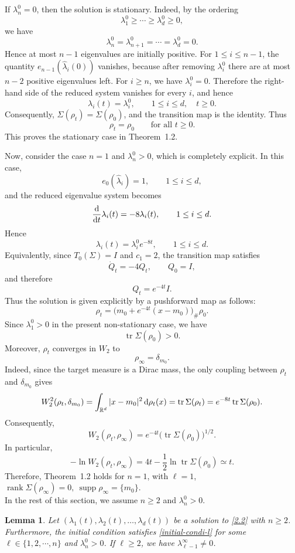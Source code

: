 \documentclass[11pt,reqno]{amsart}
\numberwithin{figure}{section}
\def\d {{\partial}}
\def\d{\mathrm{d}}
\newcommand{\dm}{d}
\renewcommand{\d}{  {\textup{d}} }
\newtheorem{lemma}{Lemma}[section]
\begin{document}
If \(\lambda_n^0=0\), then the solution is stationary. Indeed, by the ordering
\[
\lambda_1^0\ge \cdots \ge \lambda_d^0\ge 0,
\]
we have
\[
\lambda_n^0=\lambda_{n+1}^0=\cdots=\lambda_d^0=0.
\]
Hence at most \(n-1\) eigenvalues are initially positive. For \(1\le i\le n-1\), the quantity
\(e_{n-1}(\widehat\lambda_i(0))\) vanishes, because after removing \(\lambda_i^0\) there are at most
\(n-2\) positive eigenvalues left. For \(i\ge n\), we have \(\lambda_i^0=0\). Therefore the right-hand side of the reduced system vanishes for every \(i\), and hence
\[
\lambda_i(t)=\lambda_i^0,\qquad 1\le i\le d,\quad t\ge0.
\]
Consequently, \(\Sigma(\rho_t)=\Sigma(\rho_0)\), and the transition map is the identity. Thus
\[
\rho_t=\rho_0
\qquad\text{for all }t\ge0.
\]
This proves the stationary case in Theorem~1.2. 

Now, consider the case \(n=1\) and $\lambda_n^0>0$, which is completely explicit. In this case,
\[
e_0(\widehat\lambda_i)=1,
\qquad 1\le i\le d,
\]
and the reduced eigenvalue system becomes
\[
\frac{\d}{\d t}\lambda_i(t)=-8\lambda_i(t),
\qquad 1\le i\le d.
\]
Hence
\[
\lambda_i(t)=\lambda_i^0e^{-8t},
\qquad 1\le i\le d.
\]
Equivalently, since \(T_0(\Sigma)=I\) and \(c_1=2\), the transition map satisfies
\[
\dot Q_t=-4Q_t,\qquad Q_0=I,
\]
and therefore
\[
Q_t=e^{-4t}I.
\]
Thus the solution is given explicitly by a pushforward map as follows:
\[
\rho_t=\bigl(m_0+e^{-4t}(x-m_0)\bigr)_{\#}\rho_0.
\]
Since \(\lambda_1^0>0\) in the present non-stationary case, we have
\[
\operatorname{tr}\Sigma(\rho_0)>0.
\]
Moreover, \(\rho_t\) converges in \(W_2\) to
\[
\rho_\infty=\delta_{m_0}.
\]
Indeed, since the target measure is a Dirac mass, the only coupling between \(\rho_t\) and
\(\delta_{m_0}\) gives
\[
W_2^2(\rho_t,\delta_{m_0})
=
\int_{\mathbb R^d}|x-m_0|^2\,\d\rho_t(x)
=
\operatorname{tr}\Sigma(\rho_t)
=
e^{-8t}\operatorname{tr}\Sigma(\rho_0).
\]
Consequently,
\[
W_2(\rho_t,\rho_\infty)
=
e^{-4t}\bigl(\operatorname{tr}\Sigma(\rho_0)\bigr)^{1/2}.
\]
In particular,
\[
-\ln W_2(\rho_t,\rho_\infty)
=
4t-\frac12\ln\operatorname{tr}\Sigma(\rho_0)
\simeq t.
\]
Therefore, Theorem~1.2 holds for \(n=1\), with \(\ell=1\), $\operatorname{rank}\Sigma(\rho_\infty)=0,~
\operatorname{supp}\rho_\infty=\{m_0\}.$\\

In the rest of this section, we assume $n\ge2$ and $\lambda_n^0>0$.


\begin{lemma}\label{lemma:lminus1nonzero}
Let $(\lambda_1(t), \lambda_2(t), \dots, \lambda_\dm(t))$ be a solution to \eqref{2.2} with $n\geq2$. Furthermore, the initial condition satisfies \eqref{initial-condi-l} for some $\ell\in \{1, 2, \cdots, n\}$ and $\lambda_n^0>0$. If $\ell\geq 2$, we have $\lambda_{\ell-1}^\infty\neq0$.
\end{lemma}
\end{document}
